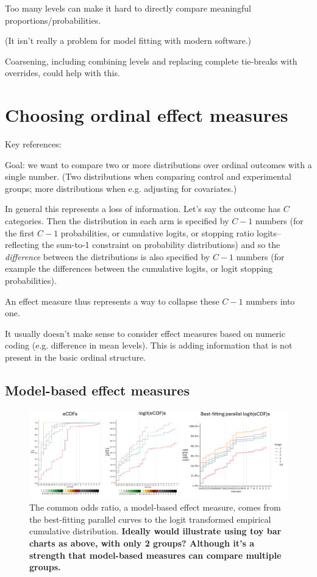 \documentclass[
  11pt,
  fleqn
]{article}
\begin{document}
Too many levels can make it hard to directly compare meaningful
proportions/probabilities.

(It isn't really a problem for model fitting with modern software.)

Coarsening, including combining levels and replacing complete
tie-breaks with overrides, could help with this.

\section{Choosing ordinal effect measures}

Key references:
\citet{agrestiMeasuresNominalOrdinalAssociation1981,agrestiOrdinalProbabilityEffect2017a,
agrestiSimpleWaysInterpret2018a}

Goal: we want to compare two or more distributions over ordinal
outcomes with a single number. (Two distributions when comparing control and
experimental groups; more distributions when e.g. adjusting for covariates.)

In general this represents a loss of information. Let's say the
outcome has $C$ categories. Then the distribution in each
arm is specified by $C-1$ numbers (for the first $C-1$ probabilities,
  or cumulative logits, or stopping ratio logits--reflecting the
sum-to-1 constraint on probability distributions) and so the
\emph{difference} between the distributions is also specified by
$C-1$ numbers (for example the differences between the cumulative
logits, or logit stopping probabilities).

An effect measure thus represents a way to collapse these $C-1$
numbers into one.

It usually doesn't make sense to consider effect measures based on
numeric coding (e.g. difference in mean levels). This is adding
information that is not present in the basic ordinal structure.

\subsection{Model-based effect measures}

\begin{figure}
  \includegraphics[width=7in]{illustrating_common_or.pdf}
  \caption{The common odds ratio, a model-based effect measure, comes
    from the best-fitting parallel curves to the logit transformed
    empirical cumulative distribution. \textbf{Ideally would illustrate
      using toy bar charts as above, with only 2 groups? Although it's a
  strength that model-based measures can compare multiple groups.}}
  \label{fig:illustrating_or}
\end{figure}
\end{document}
